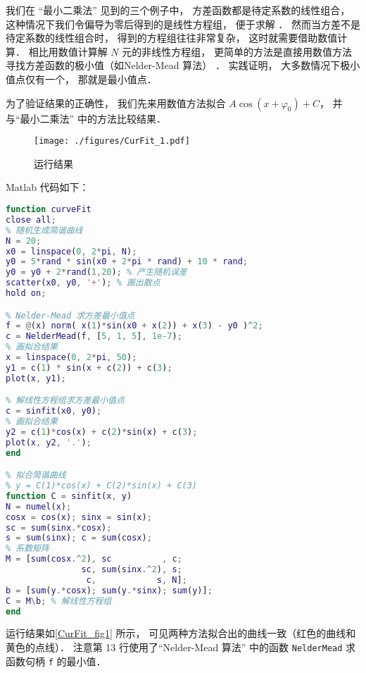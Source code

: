 
我们在 “最小二乘法” 见到的三个例子中， 方差函数都是待定系数的线性组合， 这种情况下我们令偏导为零后得到的是线性方程组， 便于求解%
． 然而当方差不是待定系数的线性组合时， 得到的方程组往往非常复杂， 这时就需要借助数值计算． 相比用数值计算解 $N$ 元的非线性方程组， 更简单的方法是直接用数值方法寻找方差函数的极小值（如Nelder-Mead 算法） ． 实践证明， 大多数情况下极小值点仅有一个， 那就是最小值点．

为了验证结果的正确性， 我们先来用数值方法拟合 $A\cos (x + \varphi_0) + C$， 并与“最小二乘法” 中的方法比较结果．

\begin{figure}[ht]
\centering
\texttt{[image: ./figures/CurFit\_1.pdf]}
\caption{运行结果} \label{CurFit_fig1}
\end{figure}

Matlab 代码如下：
\begin{lstlisting}[language=matlab, caption=curveFit.m]
function curveFit
close all;
% 随机生成简谐曲线
N = 20;
x0 = linspace(0, 2*pi, N);
y0 = 5*rand * sin(x0 + 2*pi * rand) + 10 * rand;
y0 = y0 + 2*rand(1,20); % 产生随机误差
scatter(x0, y0, '+'); % 画出散点
hold on;

% Nelder-Mead 求方差最小值点
f = @(x) norm( x(1)*sin(x0 + x(2)) + x(3) - y0 )^2;
c = NelderMead(f, [5, 1, 5], 1e-7);
% 画拟合结果
x = linspace(0, 2*pi, 50);
y1 = c(1) * sin(x + c(2)) + c(3);
plot(x, y1);

% 解线性方程组求方差最小值点
c = sinfit(x0, y0);
% 画拟合结果
y2 = c(1)*cos(x) + c(2)*sin(x) + c(3);
plot(x, y2, '.');
end

% 拟合简谐曲线
% y = C(1)*cos(x) + C(2)*sin(x) + C(3)
function C = sinfit(x, y)
N = numel(x);
cosx = cos(x); sinx = sin(x);
sc = sum(sinx.*cosx);
s = sum(sinx); c = sum(cosx);
% 系数矩阵
M = [sum(cosx.^2), sc          , c;
               sc, sum(sinx.^2), s;
                c,            s, N];
b = [sum(y.*cosx); sum(y.*sinx); sum(y)];
C = M\b; % 解线性方程组
end
\end{lstlisting}

运行结果如\autoref{CurFit_fig1} 所示， 可见两种方法拟合出的曲线一致（红色的曲线和黄色的点线）． 注意第 13 行使用了“Nelder-Mead 算法” 中的函数 \verb|NelderMead| 求函数句柄 \verb|f| 的最小值．
